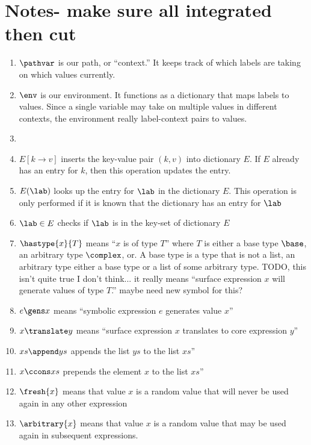 \section{{Notes- make sure all integrated then cut}}
\begin{enumerate}
    \item $\pathvar$ is our path, or ``context.'' 
    It keeps track of which labels are taking on which values currently.
    
    \item $\env$ is our environment. 
    It functions as a dictionary that maps labels to values. 
    Since a single variable may take on multiple values in different contexts, 
    the environment really label-context pairs to values.
    
    \item 
    
    \item $E[k \rightarrow v]$ inserts the key-value pair $(k, v)$ into dictionary $E$. 
    If $E$ already has an entry for $k$, then this operation updates the entry.
    
    \item $E(\lab)$ looks up the entry for $\lab$ in the dictionary $E$. 
    This operation is only performed if it is known that the dictionary has an entry for $\lab$ 
    
    \item $\lab \in E$ checks if $\lab$ is in the key-set of dictionary $E$
    
    \item $\hastype{x}{T}$ means ``$x$ is of type $T$'' where $T$ is either a base type $\base$, an arbitrary type $\complex$, or. A base type is a type that is not a list, an arbitrary type either a base type or a list of some arbitrary type. TODO, this isn't quite true I don't think... it really means ``surface expression $x$ will generate values of type $T$.'' maybe need new symbol for this?
    
    \item $e \gens x$ means ``symbolic expression $e$ generates value $x$''

    \item $x \translate y$ means ``surface expression $x$ translates to  core expression $y$''
    
    \item $xs \append ys$ appends the list $ys$ to the list $xs$''
    
    \item $x \ccons xs$ prepends the element $x$ to the list $xs$''
    
    \item $\fresh{x}$ means that value $x$ is a random value that will never be used again in any other expression
    
    \item $\arbitrary{x}$ means that value $x$ is a random value that may be used again in subsequent expressions.
\end{enumerate}
